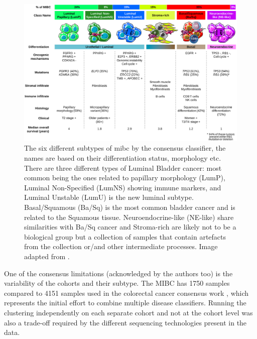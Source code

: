 \begin{figure}[!t]   
\centering
\includegraphics[width=1.0\textwidth,height=1.0\textheight,keepaspectratio]{Sections/Lit_review/Resources/2020_consensus_subtypes.jpg}
  \caption{The six different subtypes of \acrfull{mibc} by the consensus classifier\cite{Kamoun2020-tj}, the names are based on their differentiation status, morphology etc. There are three different types of Luminal Bladder cancer: most common being the ones related to papillary morphology (LumP), Luminal Non-Specified (LumNS) showing immune markers, and Luminal Unstable (LumU) is the new luminal subtype. Basal/Squamous (Ba/Sq) is the most common bladder cancer and is related to the Squamous tissue. Neuroendocrine-like (NE-like) share similarities with Ba/Sq cancer and Stroma-rich are likely not to be a biological group but a collection of samples that contain artefacts from the collection or/and other intermediate processes. Image adapted from \cite{Kamoun2020-tj}.
}
\label{fig:lit:2020_consens}
\end{figure}
\FloatBarrier


One of the consensus limitations (acknowledged by the authors too) is the variability of the cohorts and their subtype. The MIBC has 1750 samples compared to 4151 samples used in the colorectal cancer consensus work \cite{Guinney2015-fy}, which represents the initial effort to combine multiple disease classifiers. Running the clustering independently on each separate cohort and not at the cohort level was also a trade-off required by the different sequencing technologies present in the data. 

